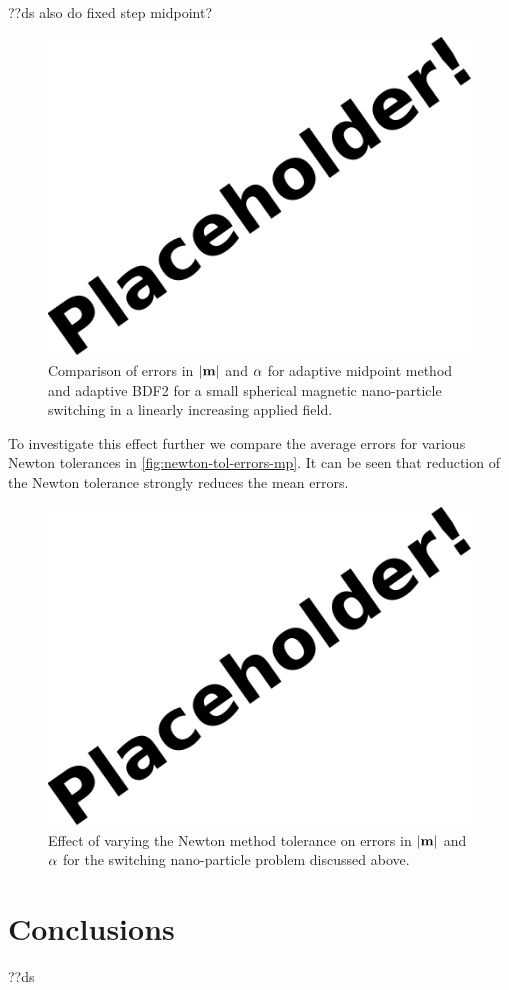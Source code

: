 ??ds also do fixed step midpoint?

\begin{figure}[\figpos]
  \centering
  \includegraphics{images/placeholder}
  \caption{Comparison of errors in $\left|{\mathbf{m}} \right|$ and $\alpha$ for adaptive midpoint method and adaptive BDF2 for a small spherical magnetic nano-particle switching in a linearly increasing applied field.}
  \label{fig:linear-field-switch-errors-mp}
\end{figure}


To investigate this effect further we compare the average errors for various Newton tolerances in \autoref{fig:newton-tol-errors-mp}.
It can be seen that reduction of the Newton tolerance strongly reduces the mean errors.

\begin{figure}[\figpos]
  \centering
  \includegraphics{images/placeholder}
  \caption{Effect of varying the Newton method tolerance on errors in $\left|{\mathbf{m}} \right|$ and $\alpha$  for the switching nano-particle problem discussed above.}
  \label{fig:newton-tol-errors-mp}
\end{figure}


\section{Conclusions}

??ds


